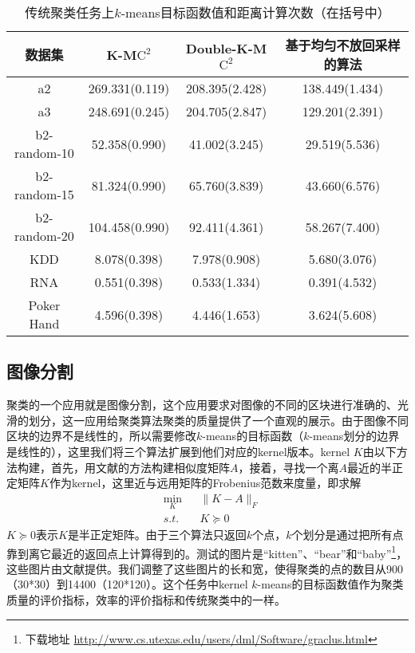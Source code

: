 \begin{table}[h]
	\caption{传统聚类任务上$k$-means目标函数值和距离计算次数（在括号中）}
	\label{tab:results on synthetic data}
	\begin{tabular}{cccc}
		\toprule
		数据集 & K-M$\text{C}^2$ & Double-K-M$\text{C}^2$ & 基于均匀不放回采样的算法 \\
		\midrule
		a2 & 269.331(0.119) & 208.395(2.428) & 138.449(1.434) \\
		a3 & 248.691(0.245) & 204.705(2.847) & 129.201(2.391) \\
		b2-random-10 & 52.358(0.990) & 41.002(3.245) & 29.519(5.536) \\
		b2-random-15 & 81.324(0.990) & 65.760(3.839) & 43.660(6.576) \\
		b2-random-20 & 104.458(0.990) & 92.411(4.361) & 58.267(7.400) \\
		\midrule %
		KDD & 8.078(0.398) & 7.978(0.908) & 5.680(3.076) \\
		RNA & 0.551(0.398) & 0.533(1.334) & 0.391(4.532) \\
		Poker Hand & 4.596(0.398) & 4.446(1.653) & 3.624(5.608) \\			
		\bottomrule
	\end{tabular}
\end{table}

\subsection{图像分割}
聚类的一个应用就是图像分割，这个应用要求对图像的不同的区块进行准确的、光滑的划分，这一应用给聚类算法聚类的质量提供了一个直观的展示。由于图像不同区块的边界不是线性的，所以需要修改$k$-means的目标函数（$k$-means划分的边界是线性的），这里我们将三个算法扩展到他们对应的kernel版本。kernel $K$由以下方法构建，首先，用文献\cite{stella2003multiclass}的方法构建相似度矩阵$A$，接着，寻找一个离$A$最近的半正定矩阵$K$作为kernel，这里近与远用矩阵的Frobenius范数来度量，即求解
\begin{equation*}
	\begin{aligned}
		& \underset{K}{\text{min}} 
		& & \lVert K - A \rVert_F \\
		& s.t. 
		& & K \succeq 0
	\end{aligned}
\end{equation*}
$K \succeq 0$表示$K$是半正定矩阵。由于三个算法只返回$k$个点，$k$个划分是通过把所有点靠到离它最近的返回点上计算得到的。测试的图片是“kitten”、“bear”和“baby”\footnote{下载地址 \url{http://www.cs.utexas.edu/users/dml/Software/graclus.html}}，这些图片由文献\cite{dhillon2004kernel}提供。我们调整了这些图片的长和宽，使得聚类的点的数目从900（30*30）到14400（120*120）。这个任务中kernel $k$-means的目标函数值作为聚类质量的评价指标，效率的评价指标和传统聚类中的一样。

